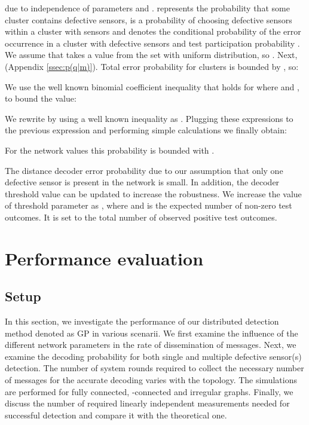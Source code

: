 \documentclass[journal]{IEEEtran}
\begin{document}
due to independence of parameters  and .  represents the probability that some cluster contains  defective sensors,  is a probability of choosing  defective sensors within a cluster with  sensors and  denotes the conditional probability of the error occurrence in a cluster with  defective sensors and test participation probability . We assume that  takes a value from the set  with uniform distribution, so . Next,  (Appendix \ref{ssec:p(q|m)}). Total error probability for  clusters is bounded by , so:

We use the well known binomial coefficient inequality  that holds for  where  and ,  to bound the value:

We rewrite  by using a well known inequality as . Plugging these expressions to the previous expression and performing simple calculations we finally obtain:

For the network values  this probability is bounded with .

The distance decoder error probability due to our assumption that only one defective sensor is present in the network is small. In addition, the decoder threshold value can be updated to increase the robustness. We increase the value of threshold parameter as , where  and  is the expected number of non-zero test outcomes. It is set to the total number of observed positive test outcomes. 


\section{Performance evaluation}\label{sec:exper}
\subsection{Setup}
In this section, we investigate the performance of our distributed detection method denoted as GP in various scenarii. We first examine the influence of the different network parameters in the rate of dissemination of messages. Next, we examine the decoding probability for both single and multiple defective sensor(s) detection. The number of system rounds required to collect the necessary number of messages for the accurate decoding varies with the topology. The simulations are performed for fully connected, -connected and irregular graphs. Finally, we discuss the number of required linearly independent measurements needed for successful detection and compare it with the theoretical one. 
\end{document}
